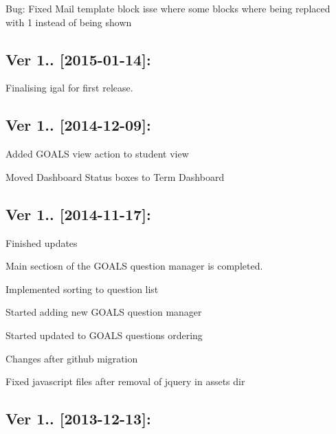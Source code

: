 \begin{DoxyItemize}
\item Bug\+: Fixed Mail template block isse where some blocks where being replaced with 1 instead of being shown
\end{DoxyItemize}

\subsection*{Ver 1.. \mbox{[}2015-\/01-\/14\mbox{]}\+: }


\begin{DoxyItemize}
\item Finalising igal for first release.
\end{DoxyItemize}

\subsection*{Ver 1.. \mbox{[}2014-\/12-\/09\mbox{]}\+: }


\begin{DoxyItemize}
\item Added G\+O\+A\+L\+S view action to student view
\item Moved Dashboard Status boxes to Term Dashboard
\end{DoxyItemize}

\subsection*{Ver 1.. \mbox{[}2014-\/11-\/17\mbox{]}\+: }


\begin{DoxyItemize}
\item Finished updates
\item Main sectiosn of the G\+O\+A\+L\+S question manager is completed.
\item Implemented sorting to question list
\item Started adding new G\+O\+A\+L\+S question manager
\item Started updated to G\+O\+A\+L\+S questions ordering
\item Changes after github migration
\item Fixed javascript files after removal of jquery in assets dir
\end{DoxyItemize}

\subsection*{Ver 1.. \mbox{[}2013-\/12-\/13\mbox{]}\+: }


